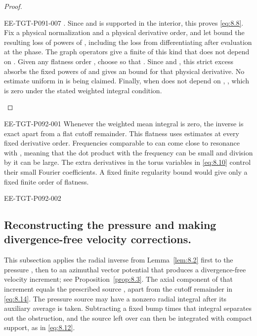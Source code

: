 \begin{proof}
\begin{EESegment}{EE-TGT-P091-007}
. Since
 and
 is supported in the interior, this proves
\eqref{eq:8.8}. Fix a physical normalization and a physical derivative order, and let
 bound the resulting loss of powers of
, including the loss from differentiating after evaluation at the phase. The
graph operators give a finite  of this kind that does not depend on
. Given any flatness order , choose
 so that
. Since
 and , this strict excess
absorbs the fixed powers of  and gives an
 bound for that physical derivative. No estimate uniform in
 is being claimed. Finally, when  does not depend
on ,
, which is zero under the stated weighted
integral condition.
\end{EESegment}
\end{proof}

\begin{EESegment}{EE-TGT-P092-001}
Whenever the weighted mean integral is zero, the inverse is exact apart from a flat cutoff
remainder. This flatness uses estimates at every fixed derivative order. Frequencies comparable to
 can come close to resonance with , meaning that
the dot product with the frequency can be small and division by it can be large. The extra
derivatives in the torus variables in \eqref{eq:8.10} control their small Fourier coefficients. A
fixed finite regularity bound would give only a fixed finite order of flatness.
\end{EESegment}

\begin{EESegment}{EE-TGT-P092-002}
\subsection{Reconstructing the pressure and making divergence-free velocity corrections.}\label{sec:8.3}
This subsection applies the radial inverse from Lemma~\ref{lem:8.2} first to the pressure
, then to an azimuthal vector potential that produces a divergence-free
velocity increment; see Proposition~\ref{prop:8.3}. The axial component of that increment equals
the prescribed source , apart from the cutoff remainder in
\eqref{eq:8.14}. The pressure source may have a nonzero radial integral after its auxiliary average is
taken. Subtracting a fixed bump times that integral separates out the obstruction, and the source
left over can then be integrated with compact support, as in \eqref{eq:8.12}.
\end{EESegment}

